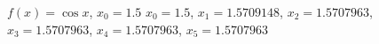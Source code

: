 {$f(x) = \cos x$, $x_0=1.5$
}
{$x_0=1.5$, $x_1=1.5709148$, $x_2=1.5707963$, $x_3=1.5707963$, $x_4=1.5707963$, $x_5=1.5707963$
}
